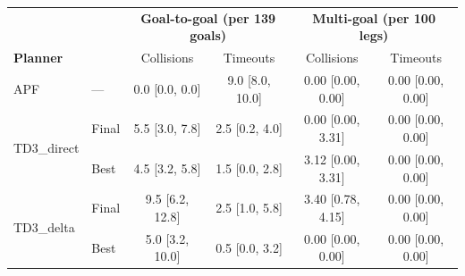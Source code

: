 \begin{tabular}{ll|cc|cc}
\midrule[1.5pt]
 & & \multicolumn{2}{c|}{\textbf{Goal-to-goal (per 139 goals)}} & \multicolumn{2}{c}{\textbf{Multi-goal (per 100 legs)}} \\
\textbf{Planner} & \textbf{} & Collisions & Timeouts & Collisions & Timeouts \\
\midrule[1.5pt]
APF & --- & 0.0 [0.0, 0.0] & 9.0 [8.0, 10.0] & 0.00 [0.00, 0.00] & 0.00 [0.00, 0.00] \\
\midrule
\multirow{2}{*}{TD3\_direct} & Final & 5.5 [3.0, 7.8] & 2.5 [0.2, 4.0] & 0.00 [0.00, 3.31] & 0.00 [0.00, 0.00] \\
                             & Best  & 4.5 [3.2, 5.8] & 1.5 [0.0, 2.8] & 3.12 [0.00, 3.31] & 0.00 [0.00, 0.00] \\
\midrule
\multirow{2}{*}{TD3\_delta}  & Final & 9.5 [6.2, 12.8] & 2.5 [1.0, 5.8] & 3.40 [0.78, 4.15] & 0.00 [0.00, 0.00] \\
                             & Best  & 5.0 [3.2, 10.0] & 0.5 [0.0, 3.2] & 0.00 [0.00, 0.00] & 0.00 [0.00, 0.00] \\
\midrule[1.5pt]
\end{tabular}
